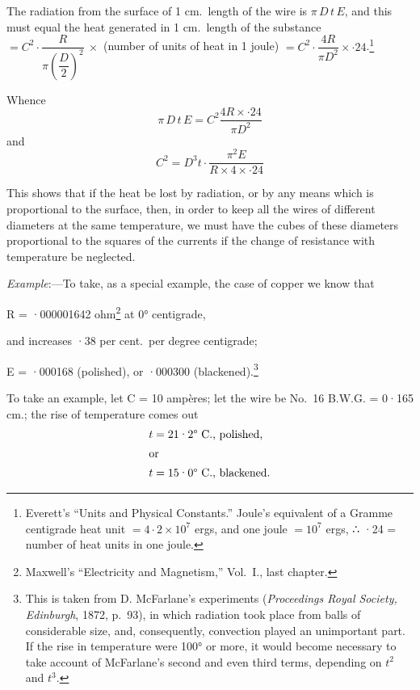\documentclass[12pt,oneside]{book}[2021/10/04]
\newenvironment{tightcenter}{%
  \setlength\topsep{2pt}
  \setlength\parskip{2pt}
  \begin{center}
}{%
  \end{center}
}
\begin{document}
The radiation from the surface of 1 cm.\ length of the wire is
\(\pi\,D\,t\,E\), and this must equal the heat generated in 1 cm.\ length
of the substance \(= C^2 \cdot \dfrac{R}{\pi\left(\dfrac{D}{2}\right)^2}~\times\) (number of units of heat in 1
joule) \(= C^2 \cdot \dfrac{4 R}{\pi D^2} \times ·24\).\footnote
  {Everett's ``Units and Physical Constants.'' Joule's equivalent of a
Gramme centigrade heat unit \(= 4·2\times 10^7\) ergs, and one joule \(= 10^7\) ergs,
∴ ·24 = number of heat units in one joule.}

Whence
\[
\pi \,D \,t \,E = C^2 \frac{4 R \times ·24}{\pi D^2}
\]
and
\[
\label{eq:a}
C^2 = D^3 t\cdot\frac{\pi^2 E}{R \times 4 \times ·24}\tag{A}
\]

This shows that if the heat be lost by radiation, or by any
means which is proportional to the surface, then, in order to keep
all the wires of different diameters at the same temperature, we
must have the cubes of these diameters proportional to the squares
of the currents if the change of resistance with temperature be
neglected.

\textit{Example}:—To take, as a special example, the case of copper
we know that
\begin{tightcenter}
R = ·000001642 ohm\footnote
  {Maxwell's ``Electricity and Magnetism,'' Vol.\ I., last chapter.}
at 0° centigrade,
\end{tightcenter}
and increases ·38 per cent.\ per degree centigrade;
\begin{tightcenter}
E = ·000168 (polished), or ·000300 (blackened).\footnote
  {This is taken from D. McFarlane's experiments (\textit{Proceedings Royal Society,
Edinburgh}, 1872, p.\ 93), in which radiation took place from balls of considerable
size, and, consequently, convection played an unimportant part. If
the rise in temperature were 100° or more, it would become necessary to take
account of McFarlane's second and even third terms, depending on \(t^2\) and \(t^3\).}
\end{tightcenter}

To take an example, let C = 10 ampères; let the wire be
No.\ 16 B.W.G. = 0·165 cm.; the rise of temperature comes out
\begin{align*}
t &= \text{21·2° C., polished,}\\
\shortintertext{or}
t &= \text{15·0° C., blackened.}
\end{align*}
\end{document}
